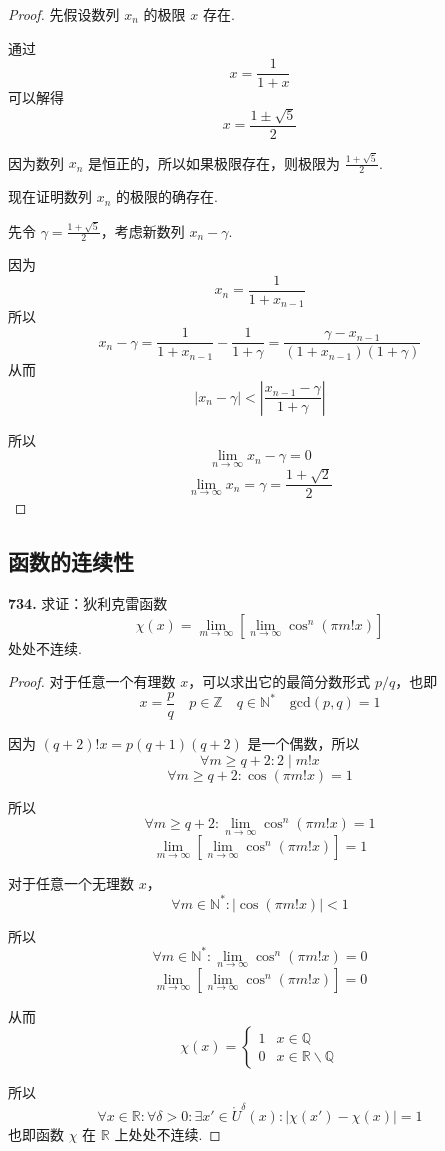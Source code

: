 \begin{proof}
    先假设数列 $x_n$ 的极限 $x$ 存在.

    通过
    \[x = \frac{1}{1 + x}\]
    可以解得
    \[x = \frac{1 \pm \sqrt{5}}{2}\]

    因为数列 $x_n$ 是恒正的，所以如果极限存在，则极限为 $\displaystyle \frac{1 + \sqrt{5}}{2}$.

    现在证明数列 $x_n$ 的极限的确存在.

    先令 $\gamma = \displaystyle \frac{1 + \sqrt{5}}{2}$，考虑新数列 $x_n - \gamma$.

    因为
    \[x_n = \frac{1}{1 + x_{n-1}}\]
    所以
    \[x_n - \gamma = \frac{1}{1 + x_{n-1}} - \frac{1}{1 + \gamma} = \frac{\gamma - x_{n-1}}{(1 + x_{n-1})(1 + \gamma)}\]
    从而
    \[\lvert x_n - \gamma \rvert < \left|\frac{x_{n-1} - \gamma}{1 + \gamma}\right|\]

    所以
    \[\lim_{n \rightarrow \infty} x_n - \gamma = 0\]
    \[\lim_{n \rightarrow \infty} x_n = \gamma = \frac{1 + \sqrt{2}}{2}\]
\end{proof}

\subsection{函数的连续性}

\textbf{734.} 求证：狄利克雷函数
\[\chi(x) = \lim_{m \rightarrow \infty} \left[\lim_{n \rightarrow \infty} \cos^n (\pi m! x)\right]\]
处处不连续.

\begin{proof}
    对于任意一个有理数 $x$，可以求出它的最简分数形式 $p/q$，也即
    \[x = \frac{p}{q} \quad p \in \mathbb{Z} \quad q \in \mathbb{N}^* \quad \mathrm{gcd}(p,q) = 1\]

    因为 $(q+2)!x = p(q+1)(q+2)$ 是一个偶数，所以
    \[\forall m \geqslant q+2: 2 \mid m!x\]
    \[\forall m \geqslant q+2: \cos(\pi m!x) = 1\]

    所以
    \[\forall m \geqslant q+2: \lim_{n \rightarrow \infty} \cos^n(\pi m!x) = 1\]
    \[\lim_{m \rightarrow \infty} \left[\lim_{n \rightarrow \infty} \cos^n (\pi m! x)\right] = 1\]

    对于任意一个无理数 $x$，
    \[\forall m \in \mathbb{N}^*: \lvert \cos(\pi m!x)\rvert < 1\]

    所以
    \[\forall m \in \mathbb{N}^*: \lim_{n \rightarrow \infty} \cos^n(\pi m!x) = 0\]
    \[\lim_{m \rightarrow \infty} \left[\lim_{n \rightarrow \infty} \cos^n (\pi m! x)\right] = 0\]

    从而
    \[\chi(x) = \begin{cases}
        1 & x \in \mathbb{Q}\\
        0 & x \in \mathbb{R}\backslash\mathbb{Q}
    \end{cases}\]

    所以
    \[\forall x \in \mathbb{R}: \forall \delta > 0: \exists x' \in \mathring{U}^\delta(x): \lvert \chi(x') - \chi(x)\rvert = 1\]
    也即函数 $\chi$ 在 $\mathbb{R}$ 上处处不连续.
\end{proof}\vspace{9pt}

